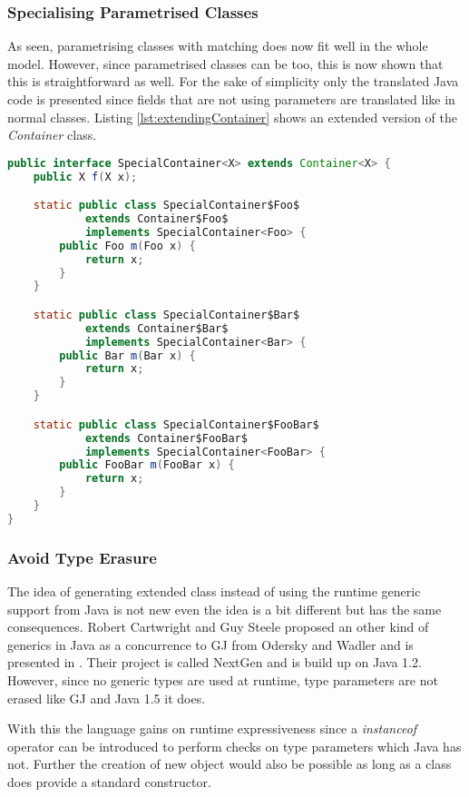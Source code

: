 \subsubsection{Specialising Parametrised Classes}
As seen, parametrising classes with matching does now fit well in
the whole model. However, since parametrised classes can be too,
this is now shown that this is straightforward as well. For the
sake of simplicity only the translated Java code is presented since
fields that are not using parameters are translated like in normal
classes. Listing \ref{lst:extendingContainer} shows an extended version
of the \emph{Container} class.

\begin{lstlisting}[float,language=java,caption=Extending a container class translated to Java,label=lst:extendingContainer]
public interface SpecialContainer<X> extends Container<X> {
	public X f(X x);

	static public class SpecialContainer$Foo$ 
			extends Container$Foo$ 
			implements SpecialContainer<Foo> {
		public Foo m(Foo x) {
			return x;
		}
	}

	static public class SpecialContainer$Bar$ 
			extends Container$Bar$ 
			implements SpecialContainer<Bar> {
		public Bar m(Bar x) {
			return x;
		}
	}

	static public class SpecialContainer$FooBar$ 
			extends Container$FooBar$ 
			implements SpecialContainer<FooBar> {
		public FooBar m(FooBar x) {
			return x;
		}
	}
}
\end{lstlisting}

\subsubsection{Avoid Type Erasure}
The idea of generating extended class instead of using the runtime
generic support from Java is not new even the idea is a bit different
but has the same consequences. Robert Cartwright and Guy Steele proposed
an other kind of generics in Java as a concurrence to GJ from Odersky
and Wadler and is presented in \cite{cartwright_compatible_1998}. Their
project is called NextGen and is build up on Java 1.2. However, since
no generic types are used at runtime, type parameters are not erased
like GJ and Java 1.5 it does.

With this the language gains on runtime expressiveness since a
\emph{instanceof} operator can be introduced to perform checks on type
parameters which Java has not. Further the creation of new object would
also be possible as long as a class does provide a standard constructor.

